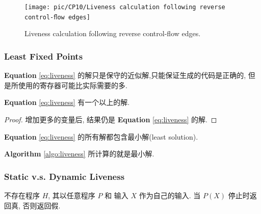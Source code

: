 \begin{figure}[H]
    \centering
    \texttt{[image: pic/CP10/Liveness calculation following reverse control-ﬂow edges]}
    \caption{Liveness calculation following reverse control-ﬂow edges.}
\end{figure}




\subsubsection{Least Fixed Points}
\textbf{Equation} \ref{eq:liveness} 的解只是保守的近似解,只能保证生成的代码是正确的, 但是所使用的寄存器可能比实际需要的多. 

\begin{theorem}
    \textbf{Equation} \ref{eq:liveness} 有一个以上的解.
\end{theorem}
\begin{proof}
    增加更多的变量后, 结果仍是 \textbf{Equation} \ref{eq:liveness} 的解.
\end{proof}

\begin{theorem}
    \textbf{Equation} \ref{eq:liveness} 的所有解都包含最小解(least solution). 
\end{theorem}

\textbf{Algorithm} \ref{algo:liveness} 所计算的就是最小解. 

\subsubsection{Static v.s. Dynamic Liveness}
\begin{theorem}
    不存在程序 $H$, 其以任意程序 $P$ 和 输入 $X$ 作为自己的输入. 当 $P(X)$ 停止时返回真, 否则返回假. 
\end{theorem}


